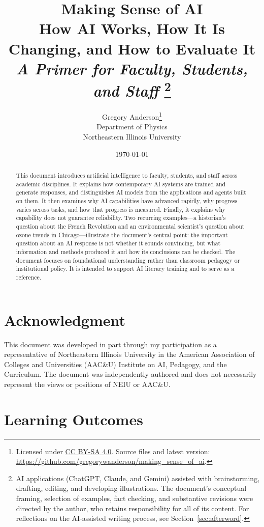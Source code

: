 \documentclass[11pt]{article}
\title{
    \textbf{Making Sense of AI}\\[4pt]
    \large How AI Works, How It Is Changing, and How to Evaluate It\\
    \textit{A Primer for Faculty, Students, and Staff}%
  \footnote{
  AI applications (ChatGPT, Claude, and Gemini) assisted with brainstorming, drafting, editing, and developing illustrations. The document's conceptual framing, selection of examples, fact checking, and substantive revisions were directed by the author, who retains responsibility for all of its content.
  For reflections on the AI-assisted writing process, see Section~\ref{sec:afterword}.}
}
\author{
    Gregory Anderson\thanks{Licensed under \ccbysa
  \href{https://creativecommons.org/licenses/by-sa/4.0/}{CC BY-SA 4.0}.
  Source files and latest version:
  \url{https://github.com/gregorywanderson/making_sense_of_ai}.}\\
    {\small Department of Physics}\\
    {\small Northeastern Illinois University}
}
\date{\today}
\begin{document}
\maketitle

\begin{abstract}
This document introduces artificial intelligence to faculty, students, and staff across academic disciplines. It explains how contemporary AI systems are trained and generate responses, and distinguishes AI models from the applications and agents built on them. It then examines why AI capabilities have advanced rapidly, why progress varies across tasks, and how that progress is measured. Finally, it explains why capability does not guarantee reliability. Two recurring examples---a historian's question about the French Revolution and an environmental scientist's question about ozone trends in Chicago---illustrate the document's central point: the important question about an AI response is not whether it sounds convincing, but what information and methods produced it and how its conclusions can be checked. The document focuses on foundational understanding rather than classroom pedagogy or institutional policy. It is intended to support AI literacy training and to serve as a reference. 
\end{abstract}

\clearpage
\tableofcontents
\clearpage

\section*{Acknowledgment}
This document was developed in part through my participation as a representative of Northeastern Illinois University in the American Association of Colleges and Universities (AAC\&U) Institute on AI, Pedagogy, and the Curriculum. The document was independently authored and does not necessarily represent the views or positions of NEIU or AAC\&U.

\section*{Learning Outcomes}
\end{document}
